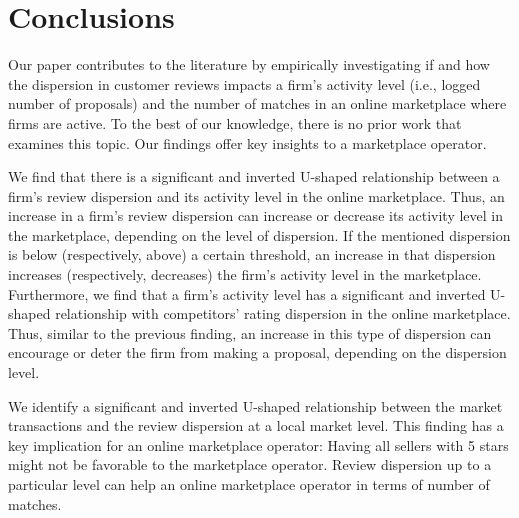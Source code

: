 \documentclass[msom,blindrev]{informs3}
\begin{document}
	
	
	
	
	
	
	
\section{Conclusions}

Our paper contributes to the literature by empirically investigating if and how the dispersion in customer reviews impacts a firm's activity level (i.e., logged number of proposals) and the number of matches in an online marketplace where firms are active. To the best of our knowledge, there is no prior work that examines this topic. Our findings offer key insights to a marketplace operator.

We find that there is a significant and inverted U-shaped relationship between a firm's review dispersion and its activity level in the online marketplace. Thus, an increase in a firm's review dispersion can increase or decrease its activity level in the marketplace, depending on the level of dispersion. If the mentioned dispersion is below (respectively, above) a certain threshold, an increase in that dispersion increases (respectively, decreases) the firm's activity level in the marketplace. Furthermore, we find that a firm's activity level  has a significant and inverted U-shaped relationship with competitors' rating dispersion in the online marketplace. Thus, similar to the previous finding, an increase in this type of dispersion can encourage or deter the firm from making a proposal, depending on the dispersion level.

We identify a significant and inverted U-shaped relationship between the market transactions and the review dispersion at a local market level. This finding has a key implication for an online marketplace operator: Having all sellers with 5 stars might not be favorable to the marketplace operator. Review dispersion up to a particular level can help an online marketplace operator in terms of number of matches.
\end{document}
